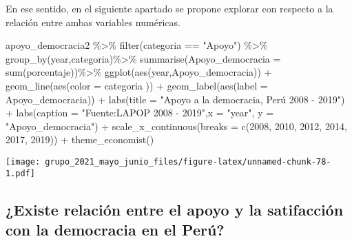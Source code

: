 \documentclass[
]{book}
\newenvironment{Shaded}{\begin{snugshade}}{\end{snugshade}}
\newcommand{\AttributeTok}[1]{\textcolor[rgb]{0.77,0.63,0.00}{#1}}
\newcommand{\DecValTok}[1]{\textcolor[rgb]{0.00,0.00,0.81}{#1}}
\newcommand{\FunctionTok}[1]{\textcolor[rgb]{0.00,0.00,0.00}{#1}}
\newcommand{\NormalTok}[1]{#1}
\newcommand{\SpecialCharTok}[1]{\textcolor[rgb]{0.00,0.00,0.00}{#1}}
\newcommand{\StringTok}[1]{\textcolor[rgb]{0.31,0.60,0.02}{#1}}
\begin{document}
En ese sentido, en el siguiente apartado se propone explorar con respecto a la relación entre ambas variables numéricas.

\begin{Shaded}
\begin{Highlighting}[]
\NormalTok{apoyo\_democracia2 }\SpecialCharTok{\%\textgreater{}\%}
  \FunctionTok{filter}\NormalTok{(categoria }\SpecialCharTok{==} \StringTok{"Apoyo"}\NormalTok{) }\SpecialCharTok{\%\textgreater{}\%} 
  \FunctionTok{group\_by}\NormalTok{(year,categoria)}\SpecialCharTok{\%\textgreater{}\%}
  \FunctionTok{summarise}\NormalTok{(}\AttributeTok{Apoyo\_democracia =} \FunctionTok{sum}\NormalTok{(porcentaje))}\SpecialCharTok{\%\textgreater{}\%}
  \FunctionTok{ggplot}\NormalTok{(}\FunctionTok{aes}\NormalTok{(year,Apoyo\_democracia)) }\SpecialCharTok{+} 
  \FunctionTok{geom\_line}\NormalTok{(}\FunctionTok{aes}\NormalTok{(}\AttributeTok{color =}\NormalTok{ categoria )) }\SpecialCharTok{+}
  \FunctionTok{geom\_label}\NormalTok{(}\FunctionTok{aes}\NormalTok{(}\AttributeTok{label =}\NormalTok{ Apoyo\_democracia)) }\SpecialCharTok{+}
  \FunctionTok{labs}\NormalTok{(}\AttributeTok{title =} \StringTok{"Apoyo a la democracia, Perú 2008 {-} 2019"}\NormalTok{) }\SpecialCharTok{+}
  \FunctionTok{labs}\NormalTok{(}\AttributeTok{caption =} \StringTok{"Fuente:LAPOP 2008 {-} 2019"}\NormalTok{,}\AttributeTok{x =} \StringTok{"year"}\NormalTok{, }\AttributeTok{y =} \StringTok{"Apoyo\_democracia"}\NormalTok{) }\SpecialCharTok{+}
  \FunctionTok{scale\_x\_continuous}\NormalTok{(}\AttributeTok{breaks =} \FunctionTok{c}\NormalTok{(}\DecValTok{2008}\NormalTok{, }\DecValTok{2010}\NormalTok{, }\DecValTok{2012}\NormalTok{, }\DecValTok{2014}\NormalTok{, }\DecValTok{2017}\NormalTok{, }\DecValTok{2019}\NormalTok{)) }\SpecialCharTok{+}
  \FunctionTok{theme\_economist}\NormalTok{()}
\end{Highlighting}
\end{Shaded}

\texttt{[image: grupo\_2021\_mayo\_junio\_files/figure-latex/unnamed-chunk-78-1.pdf]}

\hypertarget{existe-relaciuxf3n-entre-el-apoyo-y-la-satifacciuxf3n-con-la-democracia-en-el-peruxfa}{%
\subsection{¿Existe relación entre el apoyo y la satifacción con la democracia en el Perú?}\label{existe-relaciuxf3n-entre-el-apoyo-y-la-satifacciuxf3n-con-la-democracia-en-el-peruxfa}}
\end{document}
